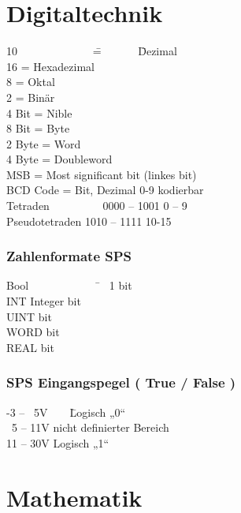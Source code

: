 \documentclass[12pt,a4paper]{article}
\begin{document}
\section{Digitaltechnik}
\begin{tabbing}
10 ~~~~~~~~~~~~~\= = ~~~~~~\= Dezimal\\
16 \> = \> Hexadezimal\\
8 \> = \> Oktal\\
2 \> = \> Binär\\
4 Bit \> = \> Nible\\
8 Bit \> = \> Byte\\
2 Byte \> = \> Word\\
4 Byte \> = \> Doubleword\\
MSB \> = \> Most significant bit (linkes bit)\\
BCD Code \> =  Bit, Dezimal 0-9 kodierbar\\
\> \> Tetraden ~~~~~~~~~0000 – 1001 0 – 9\\
\> \> Pseudotetraden 1010 – 1111 10-15
\end{tabbing}

\subsubsection{Zahlenformate SPS}
\begin{tabbing}
Bool~~~~~~~~~~~~~\= ~1 bit\\
INT Integer bit\\
UINT bit\\
WORD bit\\
REAL bit\\
\end{tabbing}

\subsubsection{SPS Eingangspegel ( True / False )}
\begin{tabbing}
-3 – ~5V~~~~\= Logisch „0“\\
~5 – 11V\> nicht definierter Bereich\\
11 – 30V\> Logisch „1“\\
\end{tabbing}
\pagebreak
\section{Mathematik}
\end{document}
